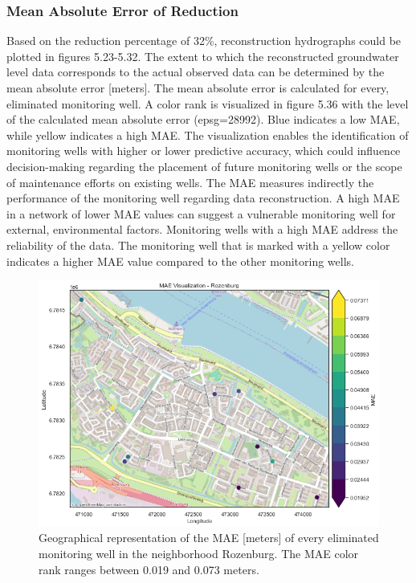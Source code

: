 \subsubsection{Mean Absolute Error of Reduction}
Based on the reduction percentage of 32\%, reconstruction hydrographs could be plotted in figures 5.23-5.32. The extent to which the reconstructed groundwater level data corresponds to the actual observed data can be determined by the mean absolute error [meters]. The mean absolute error is calculated for every, eliminated monitoring well. A color rank is visualized in figure 5.36 with the level of the calculated mean absolute error (epsg=28992). Blue indicates a low MAE, while yellow indicates a high MAE. The visualization enables the identification of monitoring wells with higher or lower predictive accuracy, which could influence decision-making regarding the placement of future monitoring wells or the scope of maintenance efforts on existing wells. The MAE measures indirectly the performance of the monitoring well regarding data reconstruction. A high MAE in a network of lower MAE values can suggest a vulnerable monitoring well for external, environmental factors. Monitoring wells with a high MAE address the reliability of the data. The monitoring well that is marked with a yellow color indicates a higher MAE value compared to the other monitoring wells. 

\begin{figure}[htbp]
    \centering
    \includegraphics[width=1\linewidth]{mae32roz.png}
    \caption{Geographical representation of the MAE [meters] of every eliminated monitoring well in the neighborhood Rozenburg. The MAE color rank ranges between 0.019 and 0.073 meters.}
\end{figure}

